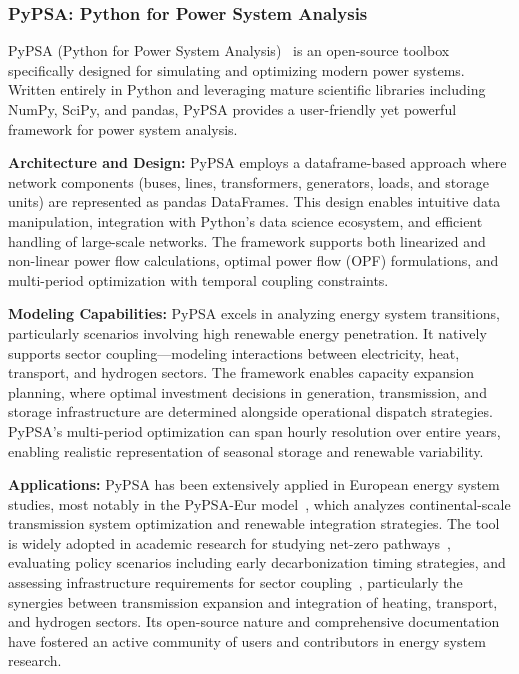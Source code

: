 \subsubsection{PyPSA: Python for Power System Analysis}

PyPSA (Python for Power System Analysis)~\cite{pypsa} is an open-source toolbox specifically designed for simulating and optimizing modern power systems. Written entirely in Python and leveraging mature scientific libraries including NumPy, SciPy, and pandas, PyPSA provides a user-friendly yet powerful framework for power system analysis.

\textbf{Architecture and Design:} PyPSA employs a dataframe-based approach where network components (buses, lines, transformers, generators, loads, and storage units) are represented as pandas DataFrames. This design enables intuitive data manipulation, integration with Python's data science ecosystem, and efficient handling of large-scale networks. The framework supports both linearized and non-linear power flow calculations, optimal power flow (OPF) formulations, and multi-period optimization with temporal coupling constraints.

\textbf{Modeling Capabilities:} PyPSA excels in analyzing energy system transitions, particularly scenarios involving high renewable energy penetration. It natively supports sector coupling—modeling interactions between electricity, heat, transport, and hydrogen sectors. The framework enables capacity expansion planning, where optimal investment decisions in generation, transmission, and storage infrastructure are determined alongside operational dispatch strategies. PyPSA's multi-period optimization can span hourly resolution over entire years, enabling realistic representation of seasonal storage and renewable variability.

\textbf{Applications:} PyPSA has been extensively applied in European energy system studies, most notably in the PyPSA-Eur model~\cite{pypsa_application}, which analyzes continental-scale transmission system optimization and renewable integration strategies. The tool is widely adopted in academic research for studying net-zero pathways~\cite{pypsa_netzero}, evaluating policy scenarios including early decarbonization timing strategies, and assessing infrastructure requirements for sector coupling~\cite{pypsa_sector_coupling}, particularly the synergies between transmission expansion and integration of heating, transport, and hydrogen sectors. Its open-source nature and comprehensive documentation have fostered an active community of users and contributors in energy system research.


